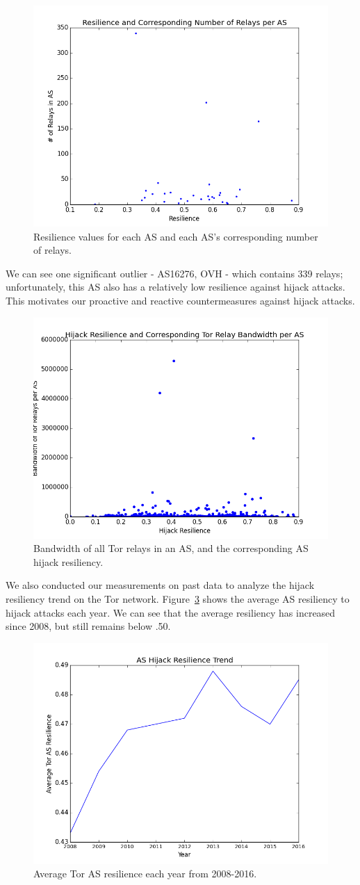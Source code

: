 \begin{figure}
\centering
\includegraphics[width=.4\textwidth]{res_num_relays}
\caption{Resilience values for each AS and each AS's corresponding number of relays.}
\label{fig:res_relays}
\end{figure}

We can see one significant outlier - AS16276, OVH - which contains 339 relays; unfortunately, this AS also has a relatively low resilience against hijack attacks.  This motivates our proactive and reactive countermeasures against hijack attacks.

\begin{figure}
\centering
\includegraphics[width=.4\textwidth]{hijack_bandwidth}
\caption{Bandwidth of all Tor relays in an AS, and the corresponding AS hijack resiliency.}
\label{fig:hijack_bw}
\end{figure}

We also conducted our measurements on past data to analyze the hijack resiliency trend on the Tor network.  Figure~\ref{fig:resilience_trend} shows the average AS resiliency to hijack attacks each year.  We can see that the average resiliency has increased since 2008, but still remains below .50.  

\begin{figure}
\centering
\includegraphics[width=.4\textwidth]{hijack_resilience_trend}
\caption{Average Tor AS resilience each year from 2008-2016.}
\label{fig:resilience_trend}
\end{figure}

